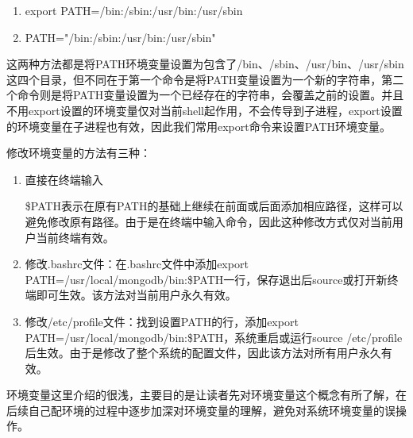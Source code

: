 \begin{enumerate}
\item export PATH=/bin:/sbin:/usr/bin:/usr/sbin

\item PATH="/bin:/sbin:/usr/bin:/usr/sbin"
\end{enumerate}

这两种方法都是将PATH环境变量设置为包含了/bin、/sbin、/usr/bin、/usr/sbin这四个目录，但不同在于第一个命令是将PATH变量设置为一个新的字符串，第二个命令则是将PATH变量设置为一个已经存在的字符串，会覆盖之前的设置。并且不用export设置的环境变量仅对当前shell起作用，不会传导到子进程，export设置的环境变量在子进程也有效，因此我们常用export命令来设置PATH环境变量。

修改环境变量的方法有三种：

\begin{enumerate}
\item 直接在终端输入


\$PATH表示在原有PATH的基础上继续在前面或后面添加相应路径，这样可以避免修改原有路径。由于是在终端中输入命令，因此这种修改方式仅对当前用户当前终端有效。

\item 修改.bashrc文件：在.bashrc文件中添加export PATH=/usr/local/mongodb/bin:\$PATH一行，保存退出后source或打开新终端即可生效。该方法对当前用户永久有效。

\item 修改/etc/profile文件：找到设置PATH的行，添加export PATH=/usr/local/mongodb/bin:\$PATH，系统重启或运行source /etc/profile后生效。由于是修改了整个系统的配置文件，因此该方法对所有用户永久有效。
\end{enumerate}

环境变量这里介绍的很浅，主要目的是让读者先对环境变量这个概念有所了解，在后续自己配环境的过程中逐步加深对环境变量的理解，避免对系统环境变量的误操作。

